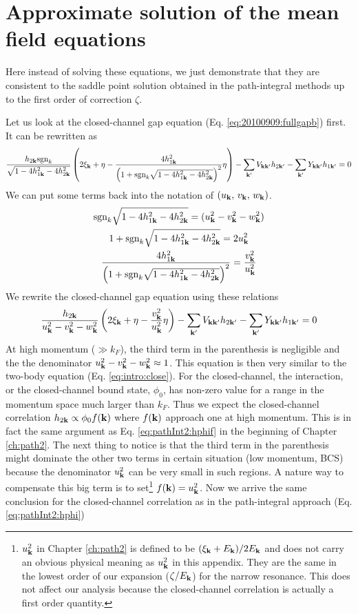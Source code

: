 \section{Approximate solution of the mean field equations}
Here instead of solving these equations, we just demonstrate that they are consistent to the saddle point solution obtained in the path-integral methods up to the first order of correction $\zeta$.

Let us look at the closed-channel gap equation (Eq. \ref{eq:20100909:fullgapb}) first.  It can be rewritten as 
\begin{multline*}
\frac{h_{2\mathbf{k}} \text{sgn}_{k}}{\sqrt{1-4 h_{1\mathbf{k}}^2-4 h_{2\mathbf{k}}^2}}\left(2 \xi_{\mathbf{k}}+\eta-\frac{4 h_{1\mathbf{k}}^{2}}{\left(1+\text{sgn}_{k}\sqrt{1-4 h_{1\mathbf{k}}^2-4 h_{2\mathbf{k}}^2}\right)^2}\eta\right)
-\sum_{\mathbf{k}'}V_{\mathbf{k}\mathbf{k}'}h_{2\mathbf{k}'}-\sum_{\mathbf{k}'}Y_{\mathbf{k}\mathbf{k}'}h_{1\mathbf{k}'}=0
\end{multline*}
We can put some terms back into the notation of $(u_{\mathbf{k}},\,v_{\mathbf{k}},\, w_{\mathbf{k}})$.
\begin{gather}
\text{sgn}_{k}\sqrt{1-4 h_{1\mathbf{k}}^2-4 h_{2\mathbf{k}}^2}=(u^{2}_{\mathbf{k}}-v_{\mathbf{k}}^{2}-w_{\mathbf{k}}^{2})\\
1+\text{sgn}_{k}\sqrt{1-4 h_{1\mathbf{k}}^2-4 h_{2\mathbf{k}}^2}=2u_{\mathbf{k}}^{2}\label{eq:meanfield:1sqrt}\\
\frac{4 h_{1\mathbf{k}}^{2} }{\left(1+\text{sgn}_{k}\sqrt{1-4 h_{1\mathbf{k}}^2-4 h_{2\mathbf{k}}^2}\right)^2}=\frac{v_{\mathbf{k}}^{2}}{u_{\mathbf{k}}^{2}}
\end{gather}
We rewrite the closed-channel gap equation using these relations
\begin{equation*}
\frac{h_{2\mathbf{k}}}{u^{2}_{\mathbf{k}}-v_{\mathbf{k}}^{2}-w_{\mathbf{k}}^{2}}\left(2 \xi_{\mathbf{k}}+\eta-\frac{v_{\mathbf{k}}^{2}}{u_{\mathbf{k}}^{2}}\eta\right)-\sum_{\mathbf{k}'}V_{\mathbf{k}\mathbf{k}'}h_{2\mathbf{k}'}-\sum_{\mathbf{k}'}Y_{\mathbf{k}\mathbf{k}'}h_{1\mathbf{k}'}=0
\end{equation*}
At high momentum ($\gg{}k_{F}$),  the third term in the parenthesis is negligible and the the denominator $u^{2}_{\mathbf{k}}-v_{\mathbf{k}}^{2}-w_{\mathbf{k}}^{2}\approx1$.  This equation is then very similar to the two-body \sch equation (Eq. \ref{eq:intro:close}). For the closed-channel, the interaction, or the closed-channel bound state, $\phi_{0}$, has non-zero value for a range  in the momentum space much larger than $k_{F}$.  Thus we expect the closed-channel correlation $h_{2\mathbf{k}}\propto\phi_{0}f(\mathbf{k})$ where $f(\mathbf{k})$ approach one at high momentum.  This is in fact the same argument as Eq. \ref{eq:pathInt2:hphif}  in the beginning of Chapter \ref{ch:path2}.  The next thing to notice is that the third term in the parenthesis might dominate the other two terms in  certain situation (low momentum, BCS) because the denominator  $u_{\mathbf{k}}^{2}$ can be very small in such regions.  A nature way to compensate this big term is to set\footnote{$u_{\mathbf{k}}^{2}$ in Chapter \ref{ch:path2} is defined to be $(\xi_{\mathbf{k}}+E_{\mathbf{k}})/2E_{\mathbf{k}}$ and does not carry an obvious physical meaning as $u_{\mathbf{k}}^{2}$ in this appendix. They are the same in the lowest order of our expansion ($\zeta/E_{\mathbf{k}}$) for the narrow resonance. This does not affect our analysis because the closed-channel correlation is actually a first order quantity.} $f(\mathbf{k})=u_{\mathbf{k}}^{2}$.  Now we arrive the same conclusion for the closed-channel correlation as in the path-integral approach (Eq. \ref{eq:pathInt2:hphi})
